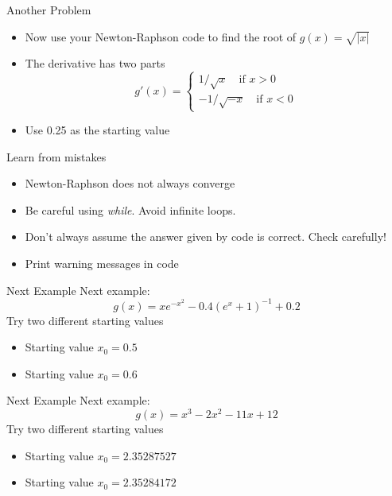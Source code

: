 \documentclass[10pt]{beamer}
\begin{document}
\begin{frame}{Another Problem}
  \begin{itemize}
  \item Now use your Newton-Raphson code to find the root of $g(x)=\sqrt{|x|}$
  \item The derivative has two parts
    \begin{equation}
      g'(x)=\left\{
        \begin{array}{l}
          1/\sqrt{x}\quad\mbox{if $x>0$}\\
          -1/\sqrt{-x}\quad\mbox{if $x<0$}
        \end{array}
      \right.
    \end{equation}
  \item Use 0.25 as the starting value
  \end{itemize}
\end{frame}
\begin{frame}{Learn from mistakes}
  \begin{itemize}
  \item Newton-Raphson does not always converge

  \item Be careful using {\em while}.  Avoid infinite loops.

  \item Don't always assume the answer given by code is correct.  Check carefully!

  \item Print warning messages in code
  \end{itemize}
\end{frame}
\begin{frame}{Next Example}
  Next example:
  \begin{equation}
    g(x)=xe^{-x^2}-0.4(e^x+1)^{-1}+0.2
  \end{equation}
  Try two different starting values
  \begin{itemize}
  \item Starting value $x_0=0.5$
  \item Starting value $x_0=0.6$
  \end{itemize}
\end{frame}
\begin{frame}{Next Example}
  Next example:
  \begin{equation}
    g(x)=x^3-2x^2-11x+12
  \end{equation}
  Try two different starting values
  \begin{itemize}
  \item Starting value $x_0=2.35287527$
  \item Starting value $x_0=2.35284172$
  \end{itemize}
\end{frame}
\end{document}
